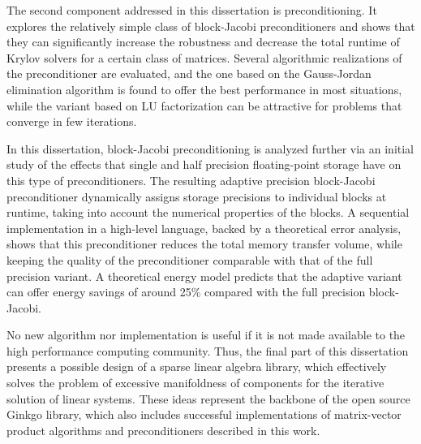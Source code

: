The second component addressed in this dissertation is preconditioning. It
explores the relatively simple class of block-Jacobi preconditioners and shows
that they can significantly increase the robustness and decrease the total
runtime of Krylov solvers for a certain class of matrices. Several algorithmic
realizations of the preconditioner are evaluated, and the one based on the
Gauss-Jordan elimination algorithm is found to offer the best performance in
most situations, while the variant based on LU factorization can be attractive
for problems that converge in few iterations.

In this dissertation, block-Jacobi preconditioning is analyzed further via an
initial study of the effects that single and half precision floating-point
storage have on this type of preconditioners. The resulting adaptive precision
block-Jacobi preconditioner dynamically assigns storage precisions to individual
blocks at runtime, taking into account the numerical properties of the blocks. A
sequential implementation in a high-level language, backed by a theoretical
error analysis, shows that this preconditioner reduces the total memory transfer
volume, while keeping the quality of the preconditioner comparable with that of
the full precision variant. A theoretical energy model predicts that the
adaptive variant can offer energy savings of around 25\% compared with the full
precision block-Jacobi.

No new algorithm nor implementation is useful if it is not made available to the
high performance computing community. Thus, the final part of this dissertation
presents a possible design of a sparse linear algebra library, which effectively
solves the problem of excessive manifoldness of components for the iterative
solution of linear systems. These ideas represent the backbone of the open
source Ginkgo library, which also includes successful implementations of
matrix-vector product algorithms and preconditioners described in this work.

